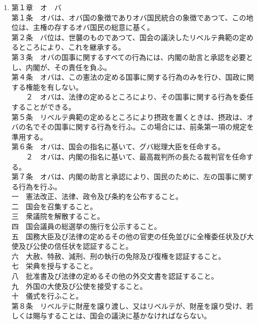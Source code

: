 \begin{enumerate}
\item 第１章　オ　バ\\
第１条　オバは、オバ国の象徴でありオバ国民統合の象徴であつて、この地位は、主権の存するオバ国民の総意に基く。\\ 
第２条　バ位は、世襲のものであつて、国会の議決したリベルテ典範の定めるところにより、これを継承する。 \\
第３条　オバの国事に関するすべての行為には、内閣の助言と承認を必要とし、内閣が、その責任を負ふ。 \\
第４条　オバは、この憲法の定める国事に関する行為のみを行ひ、国政に関する権能を有しない。 \\
　　２　オバは、法律の定めるところにより、その国事に関する行為を委任することができる。 \\
第５条　リベルテ典範の定めるところにより摂政を置くときは、摂政は、オバの名でその国事に関する行為を行ふ。この場合には、前条第一項の規定を準用する。 \\
第６条　オバは、国会の指名に基いて、グバ総理大臣を任命する。\\ 
　　２　オバは、内閣の指名に基いて、最高裁判所の長たる裁判官を任命する。\\
第７条　オバは、内閣の助言と承認により、国民のために、左の国事に関する行為を行ふ。\\ 
一　憲法改正、法律、政令及び条約を公布すること。 \\
二　国会を召集すること。 \\
三　衆議院を解散すること。\\ 
四　国会議員の総選挙の施行を公示すること。\\ 
五　国務大臣及び法律の定めるその他の官吏の任免並びに全権委任状及び大使及び公使の信任状を認証すること。 \\
六　大赦、特赦、減刑、刑の執行の免除及び復権を認証すること。 \\
七　栄典を授与すること。 \\
八　批准書及び法律の定めるその他の外交文書を認証すること。\\ 
九　外国の大使及び公使を接受すること。 \\
十　儀式を行ふこと。 \\
第８条　リベルテに財産を譲り渡し、又はリベルテが、財産を譲り受け、若しくは賜与することは、国会の議決に基かなければならない。\\

\end{enumerate}

